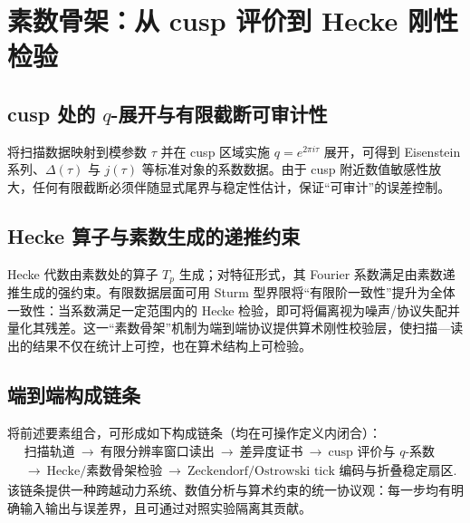 \section{素数骨架：从 cusp 评价到 Hecke 刚性检验}

\subsection{cusp 处的 \texorpdfstring{$q$}{q}-展开与有限截断可审计性}

将扫描数据映射到模参数 $\tau$ 并在 cusp 区域实施 $q=e^{2\pi i\tau}$ 展开，可得到 Eisenstein 系列、$\Delta(\tau)$ 与 $j(\tau)$ 等标准对象的系数数据。由于 cusp 附近数值敏感性放大，任何有限截断必须伴随显式尾界与稳定性估计，保证“可审计”的误差控制。

\subsection{Hecke 算子与素数生成的递推约束}

Hecke 代数由素数处的算子 $T_p$ 生成；对特征形式，其 Fourier 系数满足由素数递推生成的强约束。有限数据层面可用 Sturm 型界限将“有限阶一致性”提升为全体一致性：当系数满足一定范围内的 Hecke 检验，即可将偏离视为噪声/协议失配并量化其残差。这一“素数骨架”机制为端到端协议提供算术刚性校验层，使扫描—读出的结果不仅在统计上可控，也在算术结构上可检验。

\subsection{端到端构成链条}

将前述要素组合，可形成如下构成链条（均在可操作定义内闭合）：
\[
\begin{aligned}
&\text{扫描轨道}\ \to\ \text{有限分辨率窗口读出}\ \to\ \text{差异度证书}\ \to\ \text{cusp 评价与 $q$-系数}\\
&\to\ \text{Hecke/素数骨架检验}\ \to\ \text{Zeckendorf/Ostrowski tick 编码与折叠稳定扇区}.
\end{aligned}
\]
该链条提供一种跨越动力系统、数值分析与算术约束的统一协议观：每一步均有明确输入输出与误差界，且可通过对照实验隔离其贡献。

